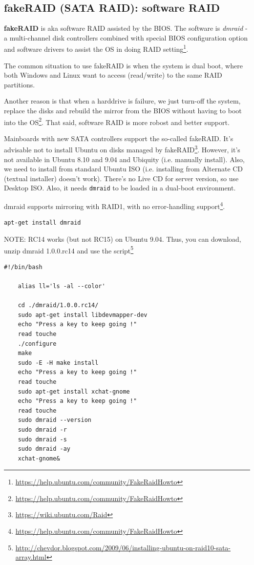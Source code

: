 \subsection{fakeRAID (SATA RAID): software RAID}
\label{sec:fakeRAID}
\label{sec:software-RAID}

{\bf fakeRAID} is aka software RAID assisted by the BIOS. The software is {\it
dmraid} - a multi-channel disk controllers combined with special BIOS
configuration option and software drivers to assist the OS in doing RAID
setting\footnote{\url{https://help.ubuntu.com/community/FakeRaidHowto}}. 

The common situation to use fakeRAID is when the system is dual boot, where both
Windows and Linux want to access (read/write) to the same RAID partitions.

Another reason is that when a harddrive is failure, we just turn-off the system,
replace the disks and rebuild the mirror from the BIOS without having to boot
into the OS\footnote{\url{https://help.ubuntu.com/community/FakeRaidHowto}}.
That said, software RAID is more robost and better support.

Mainboards with new SATA controllers support the so-called fakeRAID.
It's advisable not to install Ubuntu on disks managed by
fakeRAID\footnote{\url{https://wiki.ubuntu.com/Raid}}. However, it's not
available in Ubuntu 8.10 and 9.04 and Ubiquity (i.e. manually install). Also, we
need to install from standard Ubuntu ISO (i.e. installing from Alternate CD
(textual installer) doesn't work). There's no Live CD for server version, so use
Desktop ISO. Also, it needs \verb!dmraid! to be loaded in a dual-boot environment.

dmraid supports mirroring with RAID1, with no error-handling
support\footnote{\url{https://help.ubuntu.com/community/FakeRaidHowto}}.

\begin{verbatim}
apt-get install dmraid
\end{verbatim}
NOTE: RC14 works (but not RC15) on Ubuntu 9.04. Thus, you can download, unzip
dmraid 1.0.0.rc14 and use the
script\footnote{\url{http://chevdor.blogspot.com/2009/06/installing-ubuntu-on-raid10-sata-array.html}}
\begin{verbatim}
#!/bin/bash

    alias ll='ls -al --color'

    cd ./dmraid/1.0.0.rc14/
    sudo apt-get install libdevmapper-dev
    echo "Press a key to keep going !"
    read touche
    ./configure
    make
    sudo -E -H make install
    echo "Press a key to keep going !"
    read touche
    sudo apt-get install xchat-gnome
    echo "Press a key to keep going !"
    read touche
    sudo dmraid --version
    sudo dmraid -r
    sudo dmraid -s
    sudo dmraid -ay
    xchat-gnome&
\end{verbatim}

